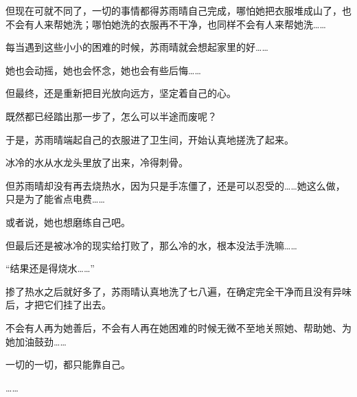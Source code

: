但现在可就不同了，一切的事情都得苏雨晴自己完成，哪怕她把衣服堆成山了，也不会有人来帮她洗；哪怕她洗的衣服再不干净，也同样不会有人来帮她洗……

每当遇到这些小小的困难的时候，苏雨晴就会想起家里的好……

她也会动摇，她也会怀念，她也会有些后悔……

但最终，还是重新把目光放向远方，坚定着自己的心。

既然都已经踏出那一步了，怎么可以半途而废呢？

于是，苏雨晴端起自己的衣服进了卫生间，开始认真地搓洗了起来。

冰冷的水从水龙头里放了出来，冷得刺骨。

但苏雨晴却没有再去烧热水，因为只是手冻僵了，还是可以忍受的……她这么做，只是为了能省点电费……

或者说，她也想磨练自己吧。

但最后还是被冰冷的现实给打败了，那么冷的水，根本没法手洗嘛……

“结果还是得烧水……”

掺了热水之后就好多了，苏雨晴认真地洗了七八遍，在确定完全干净而且没有异味后，才把它们挂了出去。

不会有人再为她善后，不会有人再在她困难的时候无微不至地关照她、帮助她、为她加油鼓劲……

一切的一切，都只能靠自己。

……
